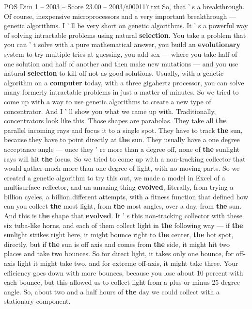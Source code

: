 \begin{textsample}{POS Dim 1 – 2003 – Score 23.00 – 2003/t000117.txt}
So, that ' s a breakthrough.
Of course, inexpensive microprocessors and a very important breakthrough — genetic algorithms.
I ' ll be very short on genetic algorithms.
It ' s a powerful way of solving intractable problems using natural \textbf{selection}.
You take a problem that you can ' t solve with a pure mathematical answer, you build an \textbf{evolutionary} system to try multiple tries at guessing, you add sex — where you take half of one solution and half of another and then make new mutations — and you use natural \textbf{selection} to kill off not-as-good solutions.
Usually, with a genetic algorithm on a \textbf{computer} today, with a three gigahertz processor, you can solve many formerly intractable problems in just a matter of minutes.
So we tried to come up with a way to use genetic algorithms to create a new type of concentrator.
And I ' ll show you what we came up with.
Traditionally, concentrators look like this.
Those shapes are parabolas.
They take all \textbf{the} parallel incoming rays and focus it to a single spot.
They have to track \textbf{the} sun, because they have to point directly at \textbf{the} sun.
They usually have a one degree acceptance angle — once they ' re more than a degree off, none of \textbf{the} sunlight rays will hit \textbf{the} focus.
So we tried to come up with a non-tracking collector that would gather much more than one degree of light, with no moving parts.
So we created a genetic algorithm to try this out, we made a model in Excel of a multisurface reflector, and an amazing thing \textbf{evolved}, literally, from trying a billion cycles, a billion different attempts, with a fitness function that defined how can you collect \textbf{the} most light, from \textbf{the} most angles, over a day, from \textbf{the} sun.
And this is \textbf{the} shape that \textbf{evolved}.
It ' s this non-tracking collector with these six tuba-like horns, and each of them collect light in \textbf{the} following way — if \textbf{the} sunlight strikes right here, it might bounce right to \textbf{the} center, \textbf{the} hot spot, directly, but if \textbf{the} sun is off axis and comes from \textbf{the} side, it might hit two places and take two bounces.
So for direct light, it takes only one bounce, for off-axis light it might take two, and for extreme off-axis, it might take three.
Your efficiency goes down with more bounces, because you lose about 10 percent with each bounce, but this allowed us to collect light from a plus or minus 25-degree angle.
So, about two and a half hours of \textbf{the} day we could collect with a stationary component.

\end{textsample}
